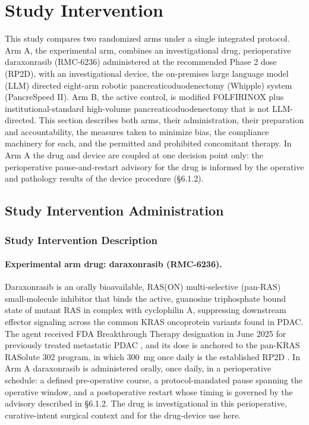 \section{Study Intervention}

This study compares two randomized arms under a single integrated protocol. Arm A,
the experimental arm, combines an investigational drug, perioperative daraxonrasib
(RMC-6236) administered at the recommended Phase 2 dose (RP2D), with an
investigational device, the on-premises large language model (LLM) directed
eight-arm robotic pancreaticoduodenectomy (Whipple) system (PancreSpeed II). Arm B,
the active control, is modified FOLFIRINOX \cite{Conroy2018} plus
institutional-standard high-volume pancreaticoduodenectomy that is not
LLM-directed. This section describes both arms, their administration, their
preparation and accountability, the measures taken to minimize bias, the compliance
machinery for each, and the permitted and prohibited concomitant therapy. In Arm A
the drug and device are coupled at one decision point only: the perioperative
pause-and-restart advisory for the drug is informed by the operative and pathology
results of the device procedure (\S6.1.2).

\subsection{Study Intervention Administration}

\subsubsection{Study Intervention Description}

\paragraph{Experimental arm drug: daraxonrasib (RMC-6236).}
Daraxonrasib is an orally bioavailable, RAS(ON) multi-selective (pan-RAS)
small-molecule inhibitor that binds the active, guanosine triphosphate bound state
of mutant RAS in complex with cyclophilin A, suppressing downstream effector
signaling across the common KRAS oncoprotein variants found in PDAC. The agent
received FDA Breakthrough Therapy designation in June 2025 for previously treated
metastatic PDAC \cite{revbreakthrough}, and its dose is anchored to the pan-KRAS
RASolute 302 program, in which 300~mg once daily is the established RP2D
\cite{rasolute302,kawchak2026phase1}. In Arm A daraxonrasib is administered orally,
once daily, in a perioperative schedule: a defined pre-operative course, a
protocol-mandated pause spanning the operative window, and a postoperative restart
whose timing is governed by the advisory described in \S6.1.2. The drug is
investigational in this perioperative, curative-intent surgical context and for the
drug-device use here.

